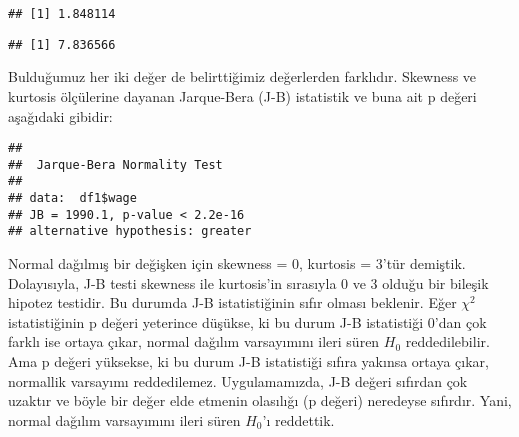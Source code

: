 \documentclass[
]{book}
\newenvironment{Shaded}{\begin{snugshade}}{\end{snugshade}}
\newcommand{\KeywordTok}[1]{\textcolor[rgb]{0.13,0.29,0.53}{\textbf{#1}}}
\newcommand{\NormalTok}[1]{#1}
\newcommand{\OperatorTok}[1]{\textcolor[rgb]{0.81,0.36,0.00}{\textbf{#1}}}
\begin{document}
\begin{Shaded}
\end{Shaded}

\begin{verbatim}
## [1] 1.848114
\end{verbatim}

\begin{Shaded}
\end{Shaded}

\begin{verbatim}
## [1] 7.836566
\end{verbatim}

Bulduğumuz her iki değer de belirttiğimiz değerlerden farklıdır. Skewness ve kurtosis ölçülerine dayanan Jarque-Bera (J-B) istatistik ve buna ait p değeri aşağıdaki gibidir:

\begin{Shaded}
\end{Shaded}

\begin{verbatim}
## 
##  Jarque-Bera Normality Test
## 
## data:  df1$wage
## JB = 1990.1, p-value < 2.2e-16
## alternative hypothesis: greater
\end{verbatim}

Normal dağılmış bir değişken için skewness = 0, kurtosis = 3'tür demiştik. Dolayısıyla, J-B testi skewness ile kurtosis'in sırasıyla 0 ve 3 olduğu bir bileşik hipotez testidir. Bu durumda J-B istatistiğinin sıfır olması beklenir. Eğer \(\chi^2\) istatistiğinin p değeri yeterince düşükse, ki bu durum J-B istatistiği 0'dan çok farklı ise ortaya çıkar, normal dağılım varsayımını ileri süren \(H_0\) reddedilebilir. Ama p değeri yüksekse, ki bu durum J-B istatistiği sıfıra yakınsa ortaya çıkar, normallik varsayımı reddedilemez. Uygulamamızda, J-B değeri sıfırdan çok uzaktır ve böyle bir değer elde etmenin olasılığı (p değeri) neredeyse sıfırdır. Yani, normal dağılım varsayımını ileri süren \(H_0\)'ı reddettik.
\end{document}
